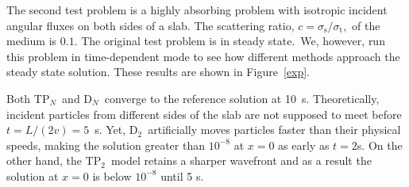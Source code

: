 \documentclass[review]{elsarticle}
\newcommand{\dn}{D$_N$}
\newcommand{\tp}[1]{TP$_{#1}$}
\newcommand{\sigmat}{\sigma_\mathrm{t}}
\newcommand{\sigmas}{\sigma_\mathrm{s}}
\begin{document}
The second test problem is a highly absorbing problem with isotropic incident angular fluxes on both sides of a slab. The scattering ratio, $c=\sigmas/\sigmat$,~of the medium is $0.1$. The original test problem is in steady state\cite{brunnerentropy}.\ We, however, run this problem in time-dependent mode to see how different methods approach the steady state solution. These results are shown in Figure\ \ref{exp}.

Both \tp{N}\ and \dn\ converge to the reference solution at 10\ s. Theoretically, incident particles from different sides of the slab are not supposed to meet before $t=L/(2v)=5$\ s. Yet, D$_2$\ artificially moves particles faster than their physical speeds, making the solution greater than $10^{-8}$ at $x=0$ as early as $t=2$s.  On the other hand, the TP$_2$\ model retains a sharper wavefront and as a result the solution at $x=0$ is below $10^{-8}$ until 5 s. 
\end{document}
